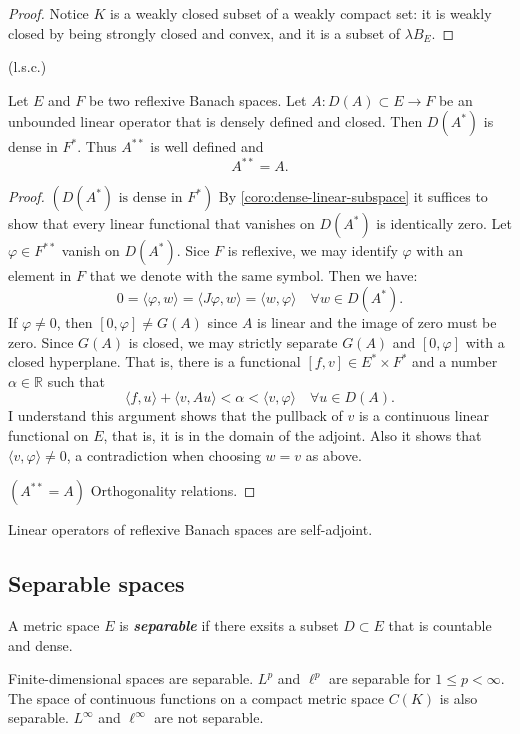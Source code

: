 \documentclass{article}
\theoremstyle{definition}
\numberwithin{equation}{section}
\newcommand{\R}{\mathbb{R}}
\begin{document}
\begin{proof}
	Notice $K$ is a weakly closed subset of a weakly compact set: it is weakly closed by being strongly closed and convex, and it is a subset of $\lambda B_E$.
\end{proof}
\begin{coro}
	(l.s.c.)
\end{coro}
\begin{thm}
	Let $E$ and $F$ be two reflexive Banach spaces. Let $A:D(A)\subset E\to F$ be an unbounded linear operator that is densely defined and closed. Then $D(A^*)$ is dense in $F^*$. Thus $A^{**}$ is well defined and
	\[A^{**}=A.\]
\end{thm}
\begin{proof}
	$(D(A^*)\text{ is dense in }F^*)$ By \cref{coro:dense-linear-subspace} it suffices to show that every linear functional that vanishes on $D(A^*)$ is identically zero. Let $\varphi\in F^{**}$ vanish on $D(A^*)$. Sice $F$ is reflexive, we may identify $\varphi$ with an element in $F$ that we denote with the same symbol. Then we have:
	\[0=\langle \varphi,w\rangle=\langle J\varphi,w\rangle=\langle w,\varphi\rangle\quad\forall w\in D(A^*).\]
	If $\varphi\neq0$, then $[0,\varphi]\neq G(A)$ since $A$ is linear and the image of zero must be zero. {\color{orange} Since $G(A)$ is closed}, we may strictly separate $G(A)$ and $[0,\varphi]$ with a closed hyperplane. That is, there is a functional $[f,v]\in E^*\times F^*$ and a number $\alpha\in \R$ such that
	\[\langle f,u\rangle+\langle v,Au\rangle<\alpha<\langle v,\varphi\rangle\quad\forall u\in D(A).\]
	{\color{orange} I understand this argument shows that the pullback of $v$ is a continuous linear functional on $E$, that is, it is in the domain of the adjoint. Also it shows that $\langle v,\varphi\rangle\neq0$, a contradiction when choosing $w=v$ as above.}
	
	$(A^{**}=A)$ {\color{orange} Orthogonality relations.}
\end{proof}
\begin{remark}
	Linear operators of reflexive Banach spaces are self-adjoint.
\end{remark}

	\subsection{Separable spaces}
A metric space $E$ is \textbf{\textit{separable}} if there exsits a subset $D\subset E$ that is countable and dense.

Finite-dimensional spaces are separable. $L^p$ and $\ell^p$ are separable for $1\leq p<\infty$. The space of continuous functions on a compact metric space $C(K)$ is also separable. $L^\infty$ and $\ell^\infty$ are not separable.
\end{document}
